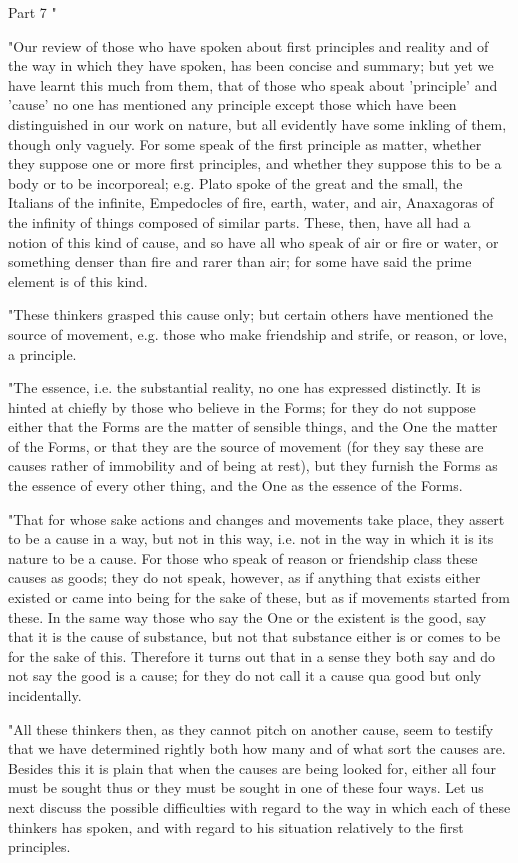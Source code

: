 Part 7 "

"Our review of those who have spoken about first principles and reality
and of the way in which they have spoken, has been concise and summary;
but yet we have learnt this much from them, that of those who speak
about 'principle' and 'cause' no one has mentioned any principle except
those which have been distinguished in our work on nature, but all
evidently have some inkling of them, though only vaguely. For some
speak of the first principle as matter, whether they suppose one or
more first principles, and whether they suppose this to be a body
or to be incorporeal; e.g. Plato spoke of the great and the small,
the Italians of the infinite, Empedocles of fire, earth, water, and
air, Anaxagoras of the infinity of things composed of similar parts.
These, then, have all had a notion of this kind of cause, and so have
all who speak of air or fire or water, or something denser than fire
and rarer than air; for some have said the prime element is of this
kind. 

"These thinkers grasped this cause only; but certain others have mentioned
the source of movement, e.g. those who make friendship and strife,
or reason, or love, a principle. 

"The essence, i.e. the substantial reality, no one has expressed distinctly.
It is hinted at chiefly by those who believe in the Forms; for they
do not suppose either that the Forms are the matter of sensible things,
and the One the matter of the Forms, or that they are the source of
movement (for they say these are causes rather of immobility and of
being at rest), but they furnish the Forms as the essence of every
other thing, and the One as the essence of the Forms. 

"That for whose sake actions and changes and movements take place,
they assert to be a cause in a way, but not in this way, i.e. not
in the way in which it is its nature to be a cause. For those who
speak of reason or friendship class these causes as goods; they do
not speak, however, as if anything that exists either existed or came
into being for the sake of these, but as if movements started from
these. In the same way those who say the One or the existent is the
good, say that it is the cause of substance, but not that substance
either is or comes to be for the sake of this. Therefore it turns
out that in a sense they both say and do not say the good is a cause;
for they do not call it a cause qua good but only incidentally.

"All these thinkers then, as they cannot pitch on another cause, seem
to testify that we have determined rightly both how many and of what
sort the causes are. Besides this it is plain that when the causes
are being looked for, either all four must be sought thus or they
must be sought in one of these four ways. Let us next discuss the
possible difficulties with regard to the way in which each of these
thinkers has spoken, and with regard to his situation relatively to
the first principles. 

